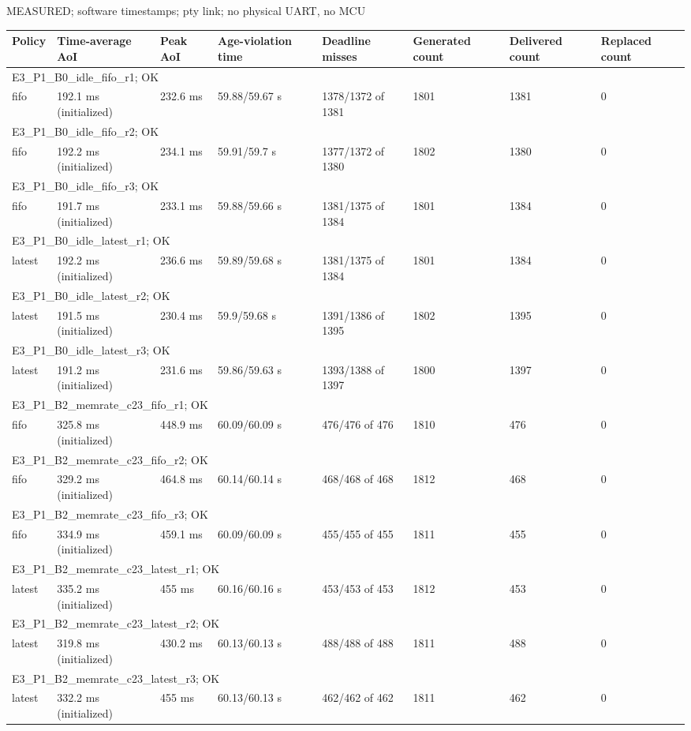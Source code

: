 \par\noindent MEASURED; software timestamps; pty link; no physical UART, no MCU\par
\begin{tabular}{llllllll}
\toprule
Policy & Time-average AoI & Peak AoI & Age-violation time & Deadline misses & Generated count & Delivered count & Replaced count \\
\midrule
\multicolumn{8}{l}{E3\_P1\_B0\_idle\_fifo\_r1; OK} \\
fifo & 192.1 ms (initialized) & 232.6 ms & 59.88/59.67 s & 1378/1372 of 1381 & 1801 & 1381 & 0 \\
\multicolumn{8}{l}{E3\_P1\_B0\_idle\_fifo\_r2; OK} \\
fifo & 192.2 ms (initialized) & 234.1 ms & 59.91/59.7 s & 1377/1372 of 1380 & 1802 & 1380 & 0 \\
\multicolumn{8}{l}{E3\_P1\_B0\_idle\_fifo\_r3; OK} \\
fifo & 191.7 ms (initialized) & 233.1 ms & 59.88/59.66 s & 1381/1375 of 1384 & 1801 & 1384 & 0 \\
\multicolumn{8}{l}{E3\_P1\_B0\_idle\_latest\_r1; OK} \\
latest & 192.2 ms (initialized) & 236.6 ms & 59.89/59.68 s & 1381/1375 of 1384 & 1801 & 1384 & 0 \\
\multicolumn{8}{l}{E3\_P1\_B0\_idle\_latest\_r2; OK} \\
latest & 191.5 ms (initialized) & 230.4 ms & 59.9/59.68 s & 1391/1386 of 1395 & 1802 & 1395 & 0 \\
\multicolumn{8}{l}{E3\_P1\_B0\_idle\_latest\_r3; OK} \\
latest & 191.2 ms (initialized) & 231.6 ms & 59.86/59.63 s & 1393/1388 of 1397 & 1800 & 1397 & 0 \\
\multicolumn{8}{l}{E3\_P1\_B2\_memrate\_c23\_fifo\_r1; OK} \\
fifo & 325.8 ms (initialized) & 448.9 ms & 60.09/60.09 s & 476/476 of 476 & 1810 & 476 & 0 \\
\multicolumn{8}{l}{E3\_P1\_B2\_memrate\_c23\_fifo\_r2; OK} \\
fifo & 329.2 ms (initialized) & 464.8 ms & 60.14/60.14 s & 468/468 of 468 & 1812 & 468 & 0 \\
\multicolumn{8}{l}{E3\_P1\_B2\_memrate\_c23\_fifo\_r3; OK} \\
fifo & 334.9 ms (initialized) & 459.1 ms & 60.09/60.09 s & 455/455 of 455 & 1811 & 455 & 0 \\
\multicolumn{8}{l}{E3\_P1\_B2\_memrate\_c23\_latest\_r1; OK} \\
latest & 335.2 ms (initialized) & 455 ms & 60.16/60.16 s & 453/453 of 453 & 1812 & 453 & 0 \\
\multicolumn{8}{l}{E3\_P1\_B2\_memrate\_c23\_latest\_r2; OK} \\
latest & 319.8 ms (initialized) & 430.2 ms & 60.13/60.13 s & 488/488 of 488 & 1811 & 488 & 0 \\
\multicolumn{8}{l}{E3\_P1\_B2\_memrate\_c23\_latest\_r3; OK} \\
latest & 332.2 ms (initialized) & 455 ms & 60.13/60.13 s & 462/462 of 462 & 1811 & 462 & 0 \\
\bottomrule
\end{tabular}
